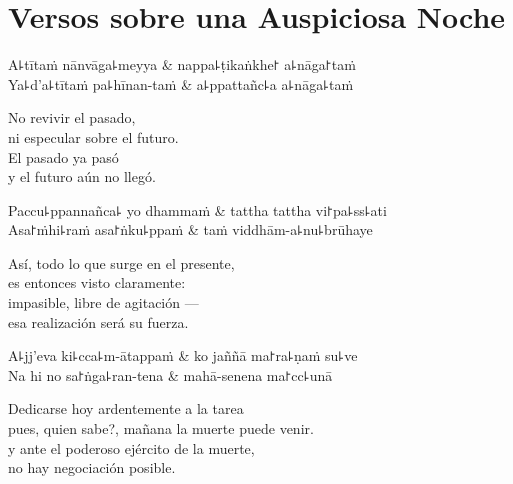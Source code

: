 \chapter{Versos sobre una Auspiciosa Noche}


\begin{leader}
\end{leader}

\begin{twochants}
  A꜕tītaṁ nānvāga꜕meyya & nappa꜕ṭikaṅkhe꜓ a꜕nāga꜓taṁ \\
  Ya꜕d'a꜕tītaṁ pa꜕hīnan-taṁ & a꜕ppattañc꜕a a꜕nāga꜕taṁ \\
\end{twochants}

\begin{english}
  No revivir el pasado,\\
  ni especular sobre el futuro.\\
  El pasado ya pasó\\
  y el futuro aún no llegó.
\end{english}

\begin{twochants}
  Paccu꜕ppannañca꜕ yo dhammaṁ & tattha tattha vi꜓pa꜕ss꜕ati \\
  Asa꜓ṁhi꜕raṁ asa꜓ṅku꜕ppaṁ & taṁ viddhām-a꜕nu꜕brūhaye \\
\end{twochants}

\begin{english}
  Así, todo lo que surge en el presente,\\
  es entonces visto claramente:\\
  impasible, libre de agitación ---\\
  esa realización será su fuerza.
\end{english}

\begin{twochants}
  A꜕jj'eva ki꜕cca꜕m-ātappaṁ & ko jaññā ma꜓ra꜕ṇaṁ su꜕ve \\
  Na hi no sa꜓ṅga꜕ran-tena & mahā-senena ma꜓cc꜕unā \\
\end{twochants}

\begin{english}
  Dedicarse hoy ardentemente a la tarea\\
  pues, quien sabe?, mañana la muerte puede venir.\\
  y ante el poderoso ejército de la muerte,\\
  no hay negociación posible.
\end{english}

